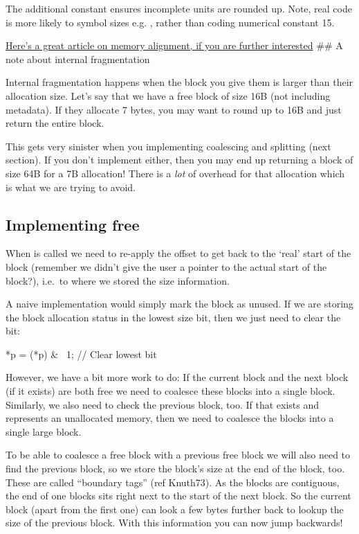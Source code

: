 The additional constant ensures incomplete units are rounded up. Note, real code is more likely to symbol sizes e.g. , rather than coding numerical constant 15.

\href{http://www.ibm.com/developerworks/library/pa-dalign/}{Here's a great article on memory alignment, if you are further interested} \#\# A note about internal fragmentation

Internal fragmentation happens when the block you give them is larger than their allocation size. Let's say that we have a free block of size 16B (not including metadata). If they allocate 7 bytes, you may want to round up to 16B and just return the entire block.

This gets very sinister when you implementing coalescing and splitting (next section). If you don't implement either, then you may end up returning a block of size 64B for a 7B allocation! There is a \emph{lot} of overhead for that allocation which is what we are trying to avoid.

\subsection{Implementing free}

When  is called we need to re-apply the offset to get back to the `real' start of the block (remember we didn't give the user a pointer to the actual start of the block?), i.e.~to where we stored the size information.

A naive implementation would simply mark the block as unused. If we are storing the block allocation status in the lowest size bit, then we just need to clear the bit:

\begin{code}[language=C]
*p = (*p) & ~1; // Clear lowest bit 
\end{code}

However, we have a bit more work to do: If the current block and the next block (if it exists) are both free we need to coalesce these blocks into a single block. Similarly, we also need to check the previous block, too. If that exists and represents an unallocated memory, then we need to coalesce the blocks into a single large block.

To be able to coalesce a free block with a previous free block we will also need to find the previous block, so we store the block's size at the end of the block, too. These are called ``boundary tags'' (ref Knuth73). As the blocks are contiguous, the end of one blocks sits right next to the start of the next block. So the current block (apart from the first one) can look a few bytes further back to lookup the size of the previous block. With this information you can now jump backwards!

